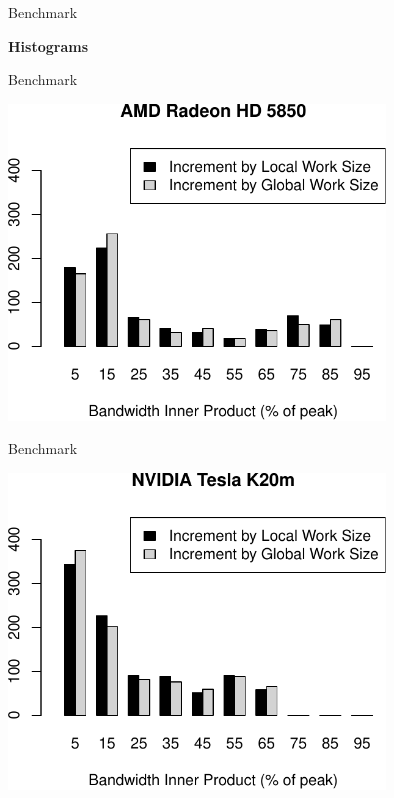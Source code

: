 

\begin{frame}{Benchmark}
  \begin{center} \Large \textbf{Histograms} \end{center}
\end{frame}

\begin{frame}{Benchmark}
  \begin{center} \includegraphics[width=0.75\textwidth]{figures/hd5850_double_hist_itertype_dot} \end{center}
\end{frame}

\begin{frame}{Benchmark}
  \begin{center} \includegraphics[width=0.75\textwidth]{figures/k20m_double_hist_itertype_dot} \end{center}
\end{frame}


